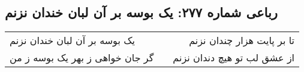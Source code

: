 \begin{center}
\section*{رباعی شماره ۲۷۷: یک بوسه بر آن لبان خندان نزنم}
\label{sec:sh277}
\begin{longtable}{l p{0.5cm} r}
یک بوسه بر آن لبان خندان نزنم
&&
تا بر پایت هزار چندان نزنم
\\
گر جان خواهی ز بهر یک بوسه ز من
&&
از عشق لب تو هیچ دندان نزنم
\\
\end{longtable}
\end{center}

